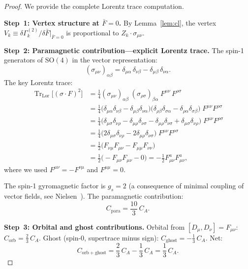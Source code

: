 \documentclass[12pt,a4paper]{article}
\theoremstyle{plain}
\theoremstyle{definition}
\theoremstyle{remark}
\begin{document}
\begin{proof}
We provide the complete Lorentz trace computation.

\textbf{Step~1: Vertex structure at $\bar{F}=0$.} By Lemma~\ref{lem:cl}, the vertex $V_k\equiv\delta\Gamma_k^{(2)}/\delta\bar{F}|_{\bar{F}=0}$ is proportional to $Z_k\cdot\sigma_{\mu\nu}$.

\textbf{Step~2: Paramagnetic contribution---explicit Lorentz trace.} The spin-1 generators of $\mathrm{SO}(4)$ in the vector representation:
\begin{equation}\label{eq:sigma}
(\sigma_{\mu\nu})_{\alpha\beta} = \delta_{\mu\alpha}\,\delta_{\nu\beta} - \delta_{\mu\beta}\,\delta_{\nu\alpha}.
\end{equation}
The key Lorentz trace:
\begin{align}
\operatorname{Tr}_{\mathrm{Lor}}\big[(\sigma\cdot F)^2\big]
&= \frac{1}{4}(\sigma_{\mu\nu})_{\alpha\beta}\;(\sigma_{\rho\sigma})_{\beta\alpha}\;F^{\mu\nu}\,F^{\rho\sigma}\label{eq:lt1}\\
&= \frac{1}{4}\big(\delta_{\mu\alpha}\delta_{\nu\beta}-\delta_{\mu\beta}\delta_{\nu\alpha}\big)\big(\delta_{\rho\beta}\delta_{\sigma\alpha}-\delta_{\rho\alpha}\delta_{\sigma\beta}\big)\;F^{\mu\nu}F^{\rho\sigma}\label{eq:lt2}\\
&= \frac{1}{4}\big(\delta_{\mu\sigma}\delta_{\nu\rho} - \delta_{\mu\rho}\delta_{\nu\sigma} - \delta_{\mu\rho}\delta_{\nu\sigma} + \delta_{\mu\sigma}\delta_{\nu\rho}\big)\;F^{\mu\nu}F^{\rho\sigma}\label{eq:lt3}\\
&= \frac{1}{4}\big(2\delta_{\mu\sigma}\delta_{\nu\rho} - 2\delta_{\mu\rho}\delta_{\nu\sigma}\big)\;F^{\mu\nu}F^{\rho\sigma}\label{eq:lt4}\\
&= \frac{1}{2}\big(F_{\nu\mu}F_{\mu\nu} - F_{\mu\mu}F_{\nu\nu}\big)\label{eq:lt5}\\
&= \frac{1}{2}\big(-F_{\mu\nu}F_{\mu\nu} - 0\big) = -\frac{1}{2}F_{\mu\nu}^a F_{\mu\nu}^a,\label{eq:lt6}
\end{align}
where we used $F^{\mu\nu}=-F^{\nu\mu}$ and $F^{\mu\mu}=0$.

The spin-1 gyromagnetic factor is $g_s=2$ (a consequence of minimal coupling of vector fields, see Nielsen~\cite{Nielsen1981}). The paramagnetic contribution:
\begin{equation}\label{eq:Cpara}
C_{\mathrm{para}} = \frac{10}{3}\,C_A.
\end{equation}

\textbf{Step~3: Orbital and ghost contributions.} Orbital from $[D_\mu,D_\nu]=F_{\mu\nu}$: $C_{\mathrm{orb}}=\frac{2}{3}\,C_A$. Ghost (spin-0, supertrace minus sign): $C_{\mathrm{ghost}}=-\frac{1}{3}\,C_A$. Net:
\begin{equation}\label{eq:Corbghost}
C_{\mathrm{orb+ghost}} = \frac{2}{3}\,C_A - \frac{1}{3}\,C_A = \frac{1}{3}\,C_A.
\end{equation}


\end{proof}
\end{document}
